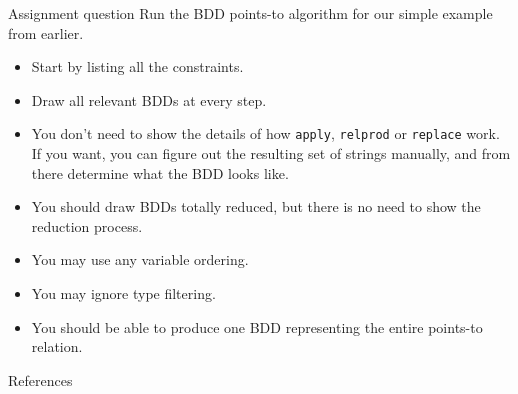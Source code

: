 \documentclass{beamer}
\begin{document}
\begin{frame}[fragile]{Assignment question}
Run the BDD points-to algorithm for our simple example from earlier. 
\begin{itemize}
\item Start by listing all the constraints.
\item Draw all relevant BDDs at every step. 
\item You don't need to show the details of how {\tt apply}, {\tt relprod}
or {\tt replace} work. If you want, you can figure out the resulting set of
strings manually, and from there determine what the BDD looks like. 
\item You should draw BDDs totally reduced, but there is no need to show 
the reduction process. 
\item You may use any variable ordering. 
\item You may ignore type filtering. 
\item You should be able to produce one BDD representing the entire 
points-to relation.
\end{itemize}
\end{frame}

\begin{frame}{References}

{\footnotesize
}
\end{frame}
\end{document}
